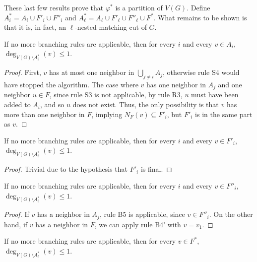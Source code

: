 These last few results prove that $\varphi^*$ is a partition of $V(G)$.
Define $A_i^* = A_i \cup F'_i \cup F''_i$ and $A_\ell^* = A_\ell \cup F'_\ell \cup F''_\ell \cup F^*$.
What remains to be shown is that it is, in fact, an $\ell$-nested matching cut of $G$.

\begin{lemma}
	If no more branching rules are applicable, then for every $i$ and every $v \in A_i$, $\deg_{V(G) \setminus A_i^*}(v) \leq 1$. 
\end{lemma}

\begin{proof}
	First, $v$ has at most one neighbor in $\bigcup_ {j \neq i} A_j$, otherwise rule S4 would have stopped the algorithm.
	The case where $v$ has one neighbor in $A_j$ and one neighbor $u \in F$, since rule S3 is not applicable, by rule R3, $u$ must have been added to $A_i$, and so $u$ does not exist.
	Thus, the only possibility is that $v$ has more than one neighbor in $F$, implying $N_F(v) \subseteq F'_i$, but $F'_i$ is in the same part as $v$.
\end{proof}

\begin{lemma}
	If no more branching rules are applicable, then for every $i$ and every $v \in F'_i$, $\deg_{V(G) \setminus A_i^*}(v) \leq 1$. 
\end{lemma}

\begin{proof}
	Trivial due to the hypothesis that $F'_i$ is final.
\end{proof}


\begin{lemma}
	If no more branching rules are applicable, then for every $i$ and every $v \in F''_i$, $\deg_{V(G) \setminus A_i^*}(v) \leq 1$. 
\end{lemma}


\begin{proof}
	If $v$ has a neighbor in $A_j$, rule B5 is applicable, since $v \in F''_i$.
	On the other hand, if $v$ has a neighbor in $F$, we can apply rule B4' with $v = v_1$.
\end{proof}

\begin{lemma}
	If no more branching rules are applicable, then for every $v \in F^*$, $\deg_{V(G) \setminus A^*_\ell}(v) \leq 1$. 
\end{lemma}

